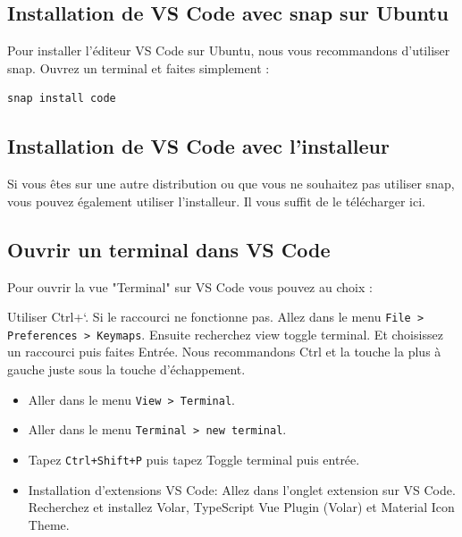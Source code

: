 \subsection{Installation de {\color{monOrange}VS Code} avec snap sur Ubuntu}
Pour installer l'éditeur {\color{monOrange}VS Code} sur {\color{monOrange}Ubuntu}, nous vous recommandons d'utiliser {\color{monOrange}snap}. Ouvrez un terminal et faites simplement :
\begin{verbatim}
snap install code
\end{verbatim}

\subsection{Installation de VS Code avec l'installeur}
Si vous êtes sur une autre distribution ou que vous ne souhaitez pas utiliser {\color{monOrange}snap}, vous pouvez également utiliser l'installeur. Il vous suffit de le télécharger ici.

\subsection{Ouvrir un terminal dans {\color{monOrange}VS Code}}
Pour ouvrir la vue "Terminal" sur VS Code vous pouvez au choix :

Utiliser {\color{monOrange}Ctrl+`}. Si le raccourci ne fonctionne pas. Allez dans le menu {\tt File > Preferences > Keymaps}. Ensuite recherchez view toggle terminal. Et choisissez un raccourci puis faites Entrée. Nous recommandons Ctrl et la touche la plus à gauche juste sous la touche d'échappement.
\begin{itemize}
\item Aller dans le menu {\tt View > Terminal}.

\item Aller dans le menu {\tt Terminal > new terminal}.

\item Tapez {\tt Ctrl+Shift+P} puis tapez Toggle terminal puis entrée.
\item Installation d'extensions {\color{monOrange}VS Code}: Allez dans l'onglet extension sur {\color{monOrange}VS Code}. Recherchez et installez {\color{monOrange}Volar, TypeScript Vue Plugin (Volar)} et {\color{monOrange}Material Icon Theme}.
\end{itemize}



